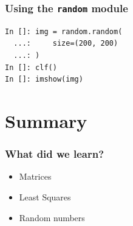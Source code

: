 \documentclass[14pt,compress]{beamer}
\newcounter{time}
\newcommand{\inctime}[1]{\addtocounter{time}{#1}{\tiny \thetime\ m}}
\newcommand{\typ}[1]{\lstinline{#1}}
\begin{document}
\begin{frame}[fragile]
    \frametitle{Using the \typ{random} module}
\begin{lstlisting}
In []: img = random.random(
  ...:     size=(200, 200)
  ...: )
In []: clf()
In []: imshow(img)
\end{lstlisting}
\end{frame}



\section{Summary}
\begin{frame}
  \frametitle{What did we learn?}
  \begin{itemize}
  \item Matrices
  \item Least Squares
  \item Random numbers
  \end{itemize}
\inctime{10}
\end{frame}
\end{document}
